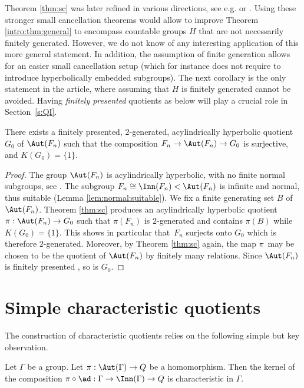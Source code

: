 \begin{remark}
Theorem \ref{thm:sc} was later refined in various directions, see e.g. \cite[Prop.\,3.3]{hull:improved} or \cite[Th.\,3.27]{CIOS}. Using these stronger small cancellation theorems would allow to improve Theorem \ref{intro:thm:general} to encompass countable groups $H$ that are not necessarily finitely generated. However, we do not know of any interesting application of this more general statement.
In addition, the assumption of finite generation allows for an easier small cancellation setup (which for instance does not require to introduce hyperbolically embedded subgroups).
The next corollary is the only statement in the article, where assuming that $H$ is finitely generated cannot be avoided.
Having \emph{finitely presented} quotients as below will play a crucial role in Section~\ref{s:QI}.
\end{remark}

\begin{corollary}
\label{lem:fp}
There exists a finitely presented, $2$-generated, acylindrically hyperbolic quotient $G_0$ of $\Aut(F_n)$ such that the composition $F_n \to \Aut(F_n) \to G_0$ is surjective, and $K(G_0) = \{ 1 \}$.
\end{corollary}

\begin{proof}
The group $\Aut(F_n)$ is acylindrically hyperbolic, with no finite normal subgroups, see \cite{auto:infend}.
The subgroup $F_n \cong \Inn(F_n) < \Aut(F_n)$ is infinite and normal, thus suitable (Lemma \ref{lem:normal:suitable}). We fix a finite generating set $B$ of $\Aut(F_n)$. Theorem \ref{thm:sc} produces an acylindrically hyperbolic quotient $\pi : \Aut(F_n) \to G_0$ such that $\pi(F_n)$ is $2$-generated and contains $\pi(B)$ while $K(G_0) = \{1\}$.
This shows in particular that~$F_n$ surjects onto $G_0$ which is therefore $2$-generated.
Moreover, by Theorem \ref{thm:sc} again, the map $\pi$~may be chosen to be the quotient of $\Aut(F_n)$ by finitely many relations.
Since $\Aut(F_n)$ is finitely presented \cite{nielsen}, so is $G_0$.
\end{proof}

\section{Simple characteristic quotients}

The construction of characteristic quotients relies on the following simple but key observation.

\begin{lemma}
\label{lem:char}
Let $\Gamma$ be a group.
Let $\pi : \Aut(\Gamma) \to Q$ be a homomorphism.
Then the kernel of the composition $\pi \circ \ad : \Gamma \to \Inn(\Gamma) \to Q$ is characteristic in $\Gamma$.
\end{lemma}

